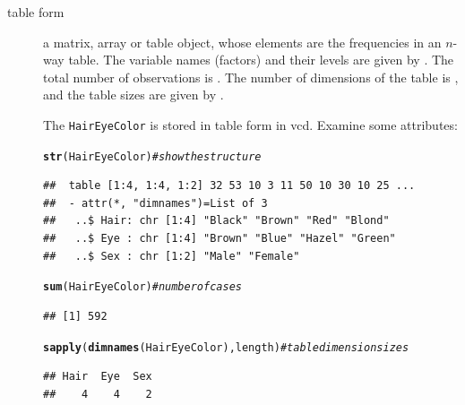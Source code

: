 \documentclass[10pt,twoside]{article}\usepackage[]{graphicx}\usepackage[]{color}
\makeatletter
\newcommand{\hlcom}[1]{\textcolor[rgb]{0.678,0.584,0.686}{\textit{#1}}}%
\newcommand{\hlstd}[1]{\textcolor[rgb]{0.345,0.345,0.345}{#1}}%
\newcommand{\hlkwd}[1]{\textcolor[rgb]{0.737,0.353,0.396}{\textbf{#1}}}%
\newenvironment{kframe}{%
 \def\at@end@of@kframe{}%
 \ifinner\ifhmode%
  \def\at@end@of@kframe{\end{minipage}}%
  \begin{minipage}{\columnwidth}%
 \fi\fi%
 \def\FrameCommand##1{\hskip\@totalleftmargin \hskip-\fboxsep
 \colorbox{shadecolor}{##1}\hskip-\fboxsep
     \hskip-\linewidth \hskip-\@totalleftmargin \hskip\columnwidth}%
 \MakeFramed {\advance\hsize-\width
   \@totalleftmargin\z@ \linewidth\hsize
   \@setminipage}}%
 {\par\unskip\endMakeFramed%
 \at@end@of@kframe}
\newenvironment{knitrout}{}{} %
\newcommand*{\Example}{\fbox{\textbf{\emph{Example}}:} }
\newcommand{\data}[1]{\texttt{#1}}
\newcommand{\pkg}[1]{{\normalfont\fontseries{b}\selectfont #1}}
\makeatother
\begin{document}
\begin{description}
  \item[table form]  a matrix, array or table object, whose elements are the frequencies
  in an $n$-way table.  The variable names (factors) and their levels are given by
  . The total number of observations
  is .  The number of dimensions of the table is ,
  and the table sizes are given by .
  	
\Example 
The \data{HairEyeColor} is stored in table form in \pkg{vcd}. Examine some attributes: 
\begin{knitrout}
\color{fgcolor}\begin{kframe}
\begin{alltt}
\hlkwd{str}\hlstd{(HairEyeColor)}                      \hlcom{# show the structure}
\end{alltt}
\begin{verbatim}
##  table [1:4, 1:4, 1:2] 32 53 10 3 11 50 10 30 10 25 ...
##  - attr(*, "dimnames")=List of 3
##   ..$ Hair: chr [1:4] "Black" "Brown" "Red" "Blond"
##   ..$ Eye : chr [1:4] "Brown" "Blue" "Hazel" "Green"
##   ..$ Sex : chr [1:2] "Male" "Female"
\end{verbatim}
\begin{alltt}
\hlkwd{sum}\hlstd{(HairEyeColor)}                      \hlcom{# number of cases}
\end{alltt}
\begin{verbatim}
## [1] 592
\end{verbatim}
\begin{alltt}
\hlkwd{sapply}\hlstd{(}\hlkwd{dimnames}\hlstd{(HairEyeColor), length)} \hlcom{# table dimension sizes}
\end{alltt}
\begin{verbatim}
## Hair  Eye  Sex 
##    4    4    2
\end{verbatim}
\end{kframe}
\end{knitrout}



\end{description}
\end{document}
